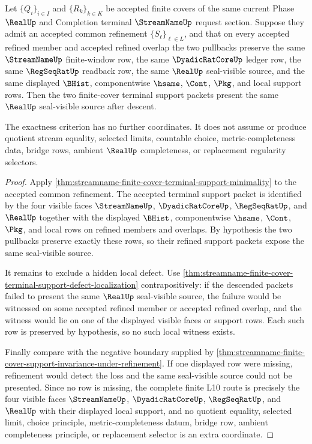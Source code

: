 \begin{theorem}
\label{thm:streamname-finite-cover-support-preservation-exactness}
Let $\{Q_i\}_{i \in I}$ and $\{R_k\}_{k \in K}$ be accepted finite covers of
the same current Phase $\RealUp$ and Completion terminal $\StreamNameUp$
request section. Suppose they admit an accepted common refinement
$\{S_\ell\}_{\ell \in L}$, and that on every accepted refined member and
accepted refined overlap the two pullbacks preserve the same $\StreamNameUp$
finite-window row, the same $\DyadicRatCoreUp$ ledger row, the same
$\RegSeqRatUp$ readback row, the same $\RealUp$ seal-visible source, and the
same displayed $\BHist$, componentwise $\hsame$, $\Cont$, $\Pkg$, and local
\NameCert{} support rows. Then the two finite-cover terminal support packets
present the same $\RealUp$ seal-visible source after descent.

The exactness criterion has no further coordinates. It does not assume or
produce quotient stream equality, selected limits, countable choice,
metric-completeness data, bridge rows, ambient $\RealUp$ completeness, or
replacement regularity selectors.
\end{theorem}
\begin{proof}
Apply
\autoref{thm:streamname-finite-cover-terminal-support-minimality} to the
accepted common refinement. The accepted terminal support packet is identified
by the four visible faces $\StreamNameUp$, $\DyadicRatCoreUp$,
$\RegSeqRatUp$, and $\RealUp$ together with the displayed $\BHist$,
componentwise $\hsame$, $\Cont$, $\Pkg$, and local \NameCert{} rows on refined
members and overlaps. By hypothesis the two pullbacks preserve exactly these
rows, so their refined support packets expose the same seal-visible source.

It remains to exclude a hidden local defect. Use
\autoref{thm:streamname-finite-cover-terminal-support-defect-localization}
contrapositively: if the descended packets failed to present the same
$\RealUp$ seal-visible source, the failure would be witnessed on some accepted
refined member or accepted refined overlap, and the witness would lie on one
of the displayed visible faces or support rows. Each such row is preserved by
hypothesis, so no such local witness exists.

Finally compare with the negative boundary supplied by
\autoref{thm:streamname-finite-cover-support-invariance-under-refinement}. If
one displayed row were missing, refinement would detect the loss and the same
seal-visible source could not be presented. Since no row is missing, the
complete finite L10 route is precisely the four visible faces
$\StreamNameUp$, $\DyadicRatCoreUp$, $\RegSeqRatUp$, and $\RealUp$ with their
displayed local support, and no quotient equality, selected limit, choice
principle, metric-completeness datum, bridge row, ambient completeness
principle, or replacement selector is an extra coordinate.
\end{proof}

